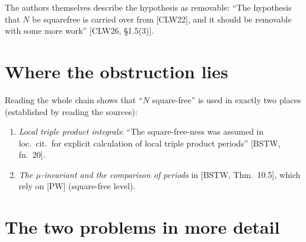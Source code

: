 \documentclass[11pt]{amsart}
\begin{document}
The authors themselves describe the hypothesis as removable: ``The hypothesis that $N$ be squarefree is carried over from [CLW22], and it should be removable with some more work'' [CLW26, \S1.5(3)].

\section{Where the obstruction lies}
\begin{center}
\end{center}
Reading the whole chain shows that ``$N$ square-free'' is used in exactly two places (established by reading the sources):
\begin{enumerate}[label=(\Alph*)]
\item \emph{Local triple product integrals}: ``The square-free-ness was assumed in loc.\ cit.\ for explicit calculation of local triple product periods'' [BSTW, fn.~20].
\item \emph{The $\mu$-invariant and the comparison of periods} in [BSTW, Thm.~10.5], which rely on [PW] (square-free level).
\end{enumerate}


\section{The two problems in more detail}
\end{document}
